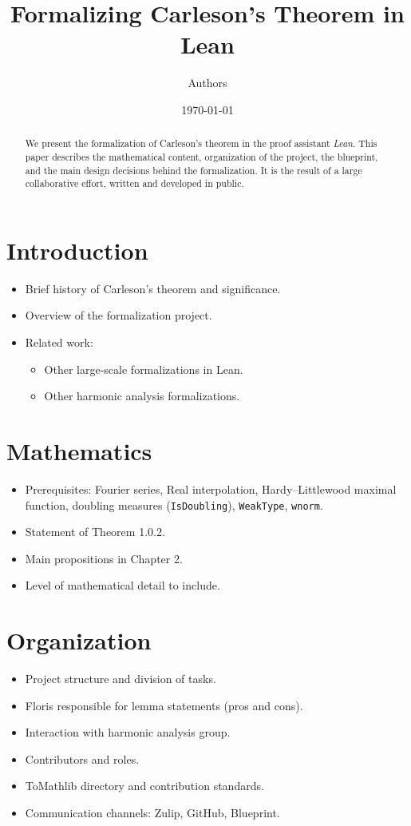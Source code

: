 \documentclass[12pt]{amsart}
\title{\textbf{Formalizing Carleson's Theorem in Lean}}
\author{Authors}
\date{\today}
\begin{document}
\maketitle

\begin{abstract}
We present the formalization of Carleson's theorem in the proof assistant \emph{Lean}.
This paper describes the mathematical content, organization of the project, the blueprint,
and the main design decisions behind the formalization. It is the result of a large
collaborative effort, written and developed in public.
\end{abstract}

\tableofcontents

\section{Introduction}
\begin{itemize}
  \item Brief history of Carleson's theorem and significance.
  \item Overview of the formalization project.
  \item Related work:
    \begin{itemize}
      \item Other large-scale formalizations in Lean.
      \item Other harmonic analysis formalizations.
    \end{itemize}
\end{itemize}

\section{Mathematics}
\begin{itemize}
  \item Prerequisites: Fourier series, Real interpolation, Hardy--Littlewood maximal function, doubling measures (\texttt{IsDoubling}), \texttt{WeakType}, \texttt{wnorm}.
  \item Statement of Theorem 1.0.2.
  \item Main propositions in Chapter 2.
  \item Level of mathematical detail to include.
\end{itemize}

\section{Organization}
\begin{itemize}
  \item Project structure and division of tasks.
  \item Floris responsible for lemma statements (pros and cons).
  \item Interaction with harmonic analysis group.
  \item Contributors and roles.
  \item ToMathlib directory and contribution standards.
  \item Communication channels: Zulip, GitHub, Blueprint.
\end{itemize}
\end{document}
